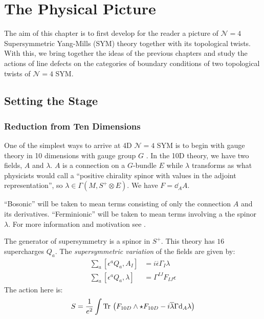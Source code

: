 \chapter{The Physical Picture\label{ch:finale}}

The aim of this chapter is to first develop for the reader a picture of $\mathcal N = 4$ Supersymmetric Yang-Mills (SYM) theory together with its topological twists. With this, we bring together the ideas of the previous chapters and study the actions of line defects on the categories of boundary conditions of two topological twists of $\mathcal N=4$ SYM.

\section{Setting the Stage} %
\label{sec:setting_the_stage}

\subsection{Reduction from Ten Dimensions} %
\label{sub:reduction_from_ten_dimensions}

One of the simplest ways to arrive at 4D $\mathcal N=4$ SYM is to begin with gauge theory in 10 dimensions with gauge group $G$ \cite{kapustin2006}. In the 10D theory, we have two fields, $A$ and $\lambda$. $A$ is a connection on a $G$-bundle $E$ while $\lambda$ transforms as what physicists would call a ``positive chirality spinor with values in the adjoint representation'', so $\lambda \in \Gamma(M, S^+ \otimes E)$. We have $F = \dd_A A$.

``Bosonic'' will be taken to mean terms consisting of only the connection $A$ and its derivatives. ``Ferminionic'' will be taken to mean terms involving a the spinor $\lambda$. For more information and motivation see \cite{schwartz2014}.

The generator of supersymmetry is a spinor in $S^+$. This theory has $16$ supercharges $Q_a$. The \emph{supersymmetric variation} of the fields are given by:
\[
\begin{aligned}
	\sum_a [\epsilon^a Q_a, A_I] &= i \overline \epsilon \Gamma_I \lambda\\
	\sum_a [\epsilon^a Q_a, \lambda] &= \Gamma^{IJ} F_{IJ} \epsilon
\end{aligned}	
\]
The action here is:
\begin{equation}
	S = \frac{1}{e^2} \int \mathrm{Tr}\, \left(F_{10D} \wedge \star F_{10D} - i \overline \lambda \Gamma \mathrm{d}_A \lambda \right) 
\end{equation}

